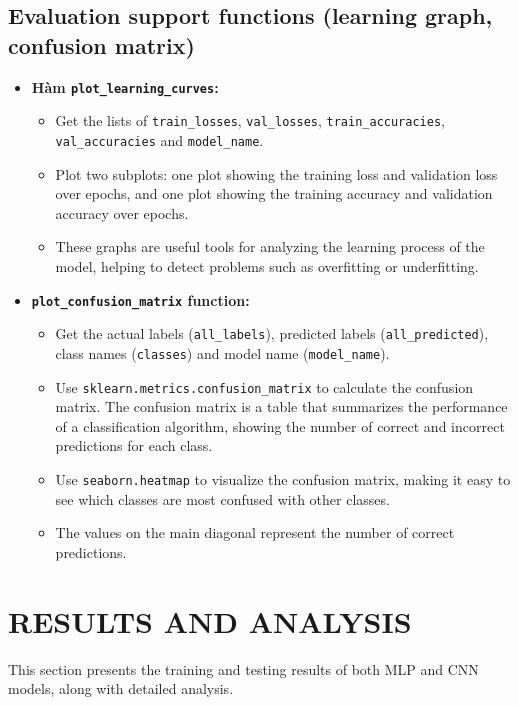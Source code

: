 \documentclass[12pt]{article}
\begin{document}
\subsection{Evaluation support functions (learning graph, confusion matrix)}
\begin{itemize}
    \item \textbf{Hàm \texttt{plot\_learning\_curves}:}
    \begin{itemize}
        \item Get the lists of \texttt{train\_losses}, \texttt{val\_losses}, \texttt{train\_accuracies}, \texttt{val\_accuracies} and \texttt{model\_name}.
        \item Plot two subplots: one plot showing the training loss and validation loss over epochs, and one plot showing the training accuracy and validation accuracy over epochs.
        \item These graphs are useful tools for analyzing the learning process of the model, helping to detect problems such as overfitting or underfitting.
    \end{itemize}
    \item \textbf{\texttt{plot\_confusion\_matrix} function:}
    \begin{itemize}
        \item Get the actual labels (\texttt{all\_labels}), predicted labels (\texttt{all\_predicted}), class names (\texttt{classes}) and model name (\texttt{model\_name}).
        \item Use \texttt{sklearn.metrics.confusion\_matrix} to calculate the confusion matrix. The confusion matrix is a table that summarizes the performance of a classification algorithm, showing the number of correct and incorrect predictions for each class.
        \item Use \texttt{seaborn.heatmap} to visualize the confusion matrix, making it easy to see which classes are most confused with other classes.
        \item The values on the main diagonal represent the number of correct predictions.
    \end{itemize}
\end{itemize}

\section{RESULTS AND ANALYSIS}
This section presents the training and testing results of both MLP and CNN models, along with detailed analysis.
\end{document}
